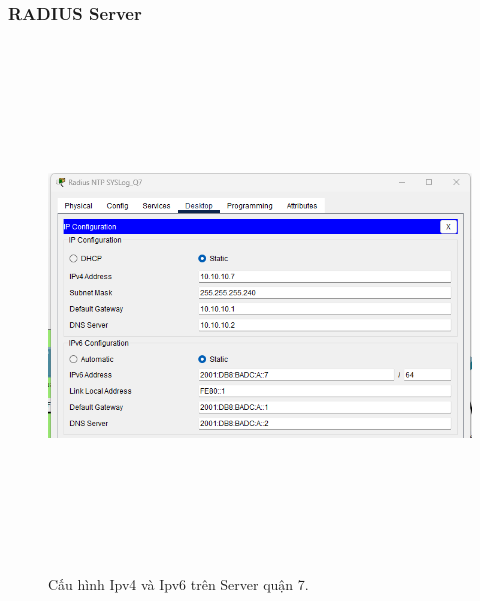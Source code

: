 \documentclass[a4paper, 12pt]{article}
\begin{document}
\subsubsection{RADIUS Server}
\begin{figure}[H]
    \centering
    \includegraphics[width=16cm, height=14cm]{img/4.2.5a.png}
    \caption{Cấu hình Ipv4 và Ipv6 trên Server quận 7.}
    \label{hinh425a}
\end{figure}
\end{document}
